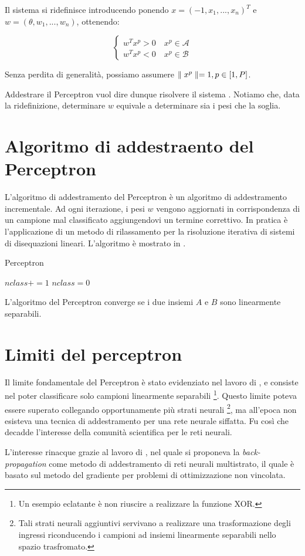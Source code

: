Il sistema  si ridefinisce introducendo ponendo $x=(-1,x_{1},...,x_{n})^{T}$ e $w=(\theta,w_{1},...,w_{n})$, ottenendo:

\begin{equation}
  \label{eqn:perceptron.learning.refined}
  \begin{cases}
    w^{T}x^{p}>0 \quad x^{p}\in\mathcal{A} \\
    w^{T}x^{p}<0 \quad x^{p}\in\mathcal{B}
  \end{cases}
\end{equation}

Senza perdita di generalità, possiamo assumere $\parallel x^{p} \parallel=1,p\in[1,P]$.

Addestrare il Perceptron vuol dire dunque risolvere il sistema . Notiamo che, data la ridefinizione, determinare $w$ equivale a determinare sia i pesi che la soglia.


\section{Algoritmo di addestraento del Perceptron}
\label{sec:perceptron.learning.algorithm}
L'algoritmo di addestramento del Perceptron è un algoritmo di addestramento incrementale. Ad ogni iterazione, i pesi $w$ vengono aggiornati in corrispondenza di un campione mal classificato aggiungendovi un termine correttivo.
In pratica è l'applicazione di un metodo di rilassamento per la risoluzione iterativa di sistemi di disequazioni lineari.
L'algoritmo è mostrato in .

\begin{algorithm}
\label{alg:perceptron}
\caption{Perceptron}
   {
     {
       {
        $nclass += 1$
      }
    }
     {
      $nclass=0$
    }
  }
\end{algorithm}

L'algoritmo del Perceptron converge se i due insiemi $A$ e $B$ sono linearmente separabili.


\section{Limiti del perceptron}
\label{sec:perceptron.limits}
Il limite fondamentale del Perceptron è stato evidenziato nel lavoro di  \cite{minsky1969perceptrons}, e consiste nel poter classificare solo campioni linearmente separabili \footnote{Un esempio eclatante è non riuscire a realizzare la funzione XOR.}.
Questo limite poteva essere superato collegando opportunamente più strati neurali \footnote{Tali strati neurali aggiuntivi servivano a realizzare una trasformazione degli ingressi riconducendo i campioni ad insiemi linearmente separabili nello spazio trasfromato.}, ma all'epoca non esisteva una tecnica di addestramento per una rete neurale siffatta. Fu così che decadde l'interesse della comunità scientifica per le reti neurali.

L'interesse rinacque grazie al lavoro di \cite{rumelhart1988learning}, nel quale si proponeva la \textit{back-propagation} come metodo di addestramento di reti neurali multistrato, il quale è basato sul metodo del gradiente per problemi di ottimizzazione non vincolata.

